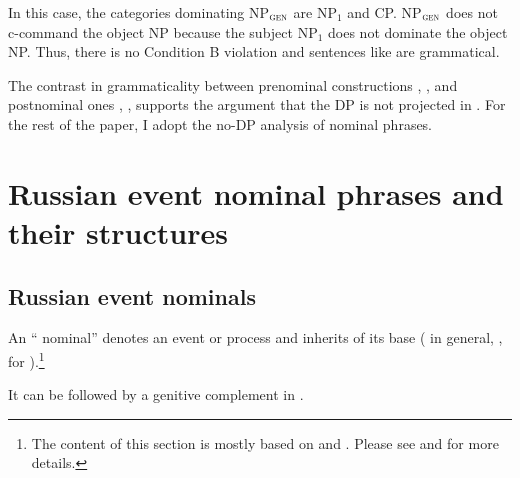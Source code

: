 \documentclass[output=paper,colorlinks,citecolor=brown,newtxmath]{langsci/langscibook}
\begin{document}
In this case, the categories dominating NP$_{\textsc{gen}}$ are NP$_1$ and CP. NP$_{\textsc{gen}}$ does not c-command the object NP because the subject NP$_1$ does not dominate the object NP. Thus, there is no Condition B violation and sentences like  are grammatical.

The contrast in grammaticality between prenominal  constructions , ,  and postnominal ones , ,  supports the argument that the DP is not projected in .
For the rest of the paper, I adopt the no-DP analysis of  nominal phrases.


\section[Russian event nominal phrases and their structures]{{Russian} {event} nominal phrases and their structures\label{sec:EVN}}

\subsection{Russian event nominals}

An `` nominal'' denotes an event or process and inherits  of its base  (\citealt{Grimshaw1990} in general, \citealt{Schoorlemmer1998}, \citealt{Pazelskaya2007} for ).\footnote{The content of this section is mostly based on \cite{MiyauchiIto2016} and \cite{Miyauchi2017b}. Please see \cite{MiyauchiIto2016} and \cite{Miyauchi2017b} for more details.}

It can be followed by a genitive complement in .
\end{document}
